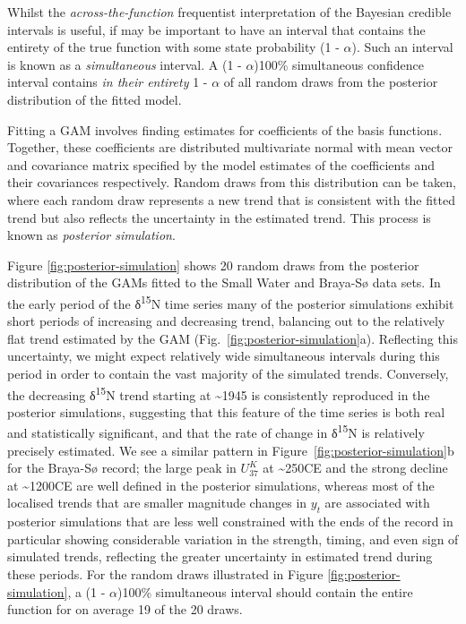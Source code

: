 \documentclass[12pt,]{article}
\newcommand{\uk}{\ensuremath{\mathit{U}^{\mathit{K}}_{\mathup{37}}}}
\begin{document}
Whilst the \emph{across-the-function} frequentist interpretation of the
Bayesian credible intervals is useful, if may be important to have an
interval that contains the entirety of the true function with some state
probability (1 - \(\alpha\)). Such an interval is known as a
\emph{simultaneous} interval. A (1 - \(\alpha\))100\% simultaneous
confidence interval contains \emph{in their entirety} 1 - \(\alpha\) of
all random draws from the posterior distribution of the fitted model.

Fitting a GAM involves finding estimates for coefficients of the basis
functions. Together, these coefficients are distributed multivariate
normal with mean vector and covariance matrix specified by the model
estimates of the coefficients and their covariances respectively. Random
draws from this distribution can be taken, where each random draw
represents a new trend that is consistent with the fitted trend but also
reflects the uncertainty in the estimated trend. This process is known
as \emph{posterior simulation}.

Figure \ref{fig:posterior-simulation} shows 20 random draws from the
posterior distribution of the GAMs fitted to the Small Water and
Braya-Sø data sets. In the early period of the δ\textsuperscript{15}N
time series many of the posterior simulations exhibit short periods of
increasing and decreasing trend, balancing out to the relatively flat
trend estimated by the GAM (Fig.~\ref{fig:posterior-simulation}a).
Reflecting this uncertainty, we might expect relatively wide
simultaneous intervals during this period in order to contain the vast
majority of the simulated trends. Conversely, the decreasing
δ\textsuperscript{15}N trend starting at \textasciitilde{}1945 is
consistently reproduced in the posterior simulations, suggesting that
this feature of the time series is both real and statistically
significant, and that the rate of change in δ\textsuperscript{15}N is
relatively precisely estimated. We see a similar pattern in
Figure~\ref{fig:posterior-simulation}b for the Braya-Sø record; the
large peak in \uk{} at \textasciitilde{}250CE and the strong decline at
\textasciitilde{}1200CE are well defined in the posterior simulations,
whereas most of the localised trends that are smaller magnitude changes
in \(y_t\) are associated with posterior simulations that are less well
constrained with the ends of the record in particular showing
considerable variation in the strength, timing, and even sign of
simulated trends, reflecting the greater uncertainty in estimated trend
during these periods. For the random draws illustrated in Figure
\ref{fig:posterior-simulation}, a (1 - \(\alpha\))100\% simultaneous
interval should contain the entire function for on average 19 of the 20
draws.
\end{document}
